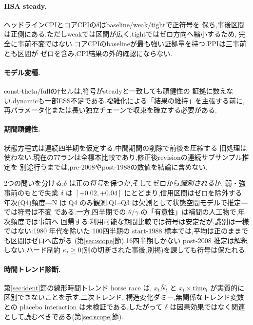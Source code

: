 \documentclass[11pt]{article}
\newcommand{\kt}{\kappa_t}
\begin{document}
\begin{table}[H]
\centering
\caption{失業ギャップ仕様の全モデル・三事前感応度.$\dagger$は収束基準外で解釈しない.}
\label{tab:current-priors}
\tiny
\resizebox{\linewidth}{!}{}
\end{table}

\paragraph{HSA steady.} ヘッドラインCPIとコアCPIの$\delta$はbaseline/weak/tightで正符号を
保ち,事後区間は正側にある.ただしweakでは区間が広く,tightではゼロ方向へ縮小するため,
完全に事前不変ではない.コアCPIのbaselineが最も強い証拠量を持つ.PPIは三事前とも区間が
ゼロを含み,CPI結果の外的確認にならない.

\paragraph{モデル変種.} const-theta/fullの$\dagger$セルは,符号がsteadyと一致しても頑健性の
証拠に数えない.dynamicも一部ESS不足である.複雑化による「結果の維持」を主張する前に,
再パラメータ化または長い独立チェーンで収束を確立する必要がある.

\paragraph{期間頑健性.} 状態方程式は連続四半期を仮定する.中間期間の削除で前後を圧縮する
旧処理は使わない.現在の77ランは全標本比較であり,修正後revisionの連続サブサンプル推定を
別途行うまでは,pre-2008やpost-1988の数値を結論に含めない.

\iffalse
2つの問いを分ける:$\delta$ は正の\emph{符号}を保つか,そしてゼロから\emph{識別される}か.
弱・強事前のもとで失業 $\delta$ は $[+0.02,+0.04]$ にとどまり,信用区間はゼロを除外する.
年次(Q4)頻度---N は Q4 のみ観測,Q1--Q3 は欠測として状態空間モデルで推定---では符号は不変
である.一方,四半期での $\theta/\gamma$ の「有意性」は補間の人工物で,年次頻度では事前へ
回帰する.利用可能な期間比較では符号は安定だが,識別は一様ではない:1980 年代を除いた
100四半期の start-1988 標本では,平均は正のままでも区間はゼロへ広がる
(第\ref{sec:scope}節).16四半期しかない post-2008 推定は解釈しない.ハード制約
$\kt\ge0$(別の切断された事後,別掲)を課しても符号は保たれる.

\paragraph{時間トレンド診断.} 第\ref{sec:ident}節の線形時間トレンド horse race は,
$x_t\bar N_t$ と $x_t\times\mathrm{time}_t$ が実質的に区別できないことを示す.二次トレンド,
構造変化ダミー,無関係なトレンド変数との placebo interaction は未検証である.したがって
$\delta$ は因果効果ではなく関連として読むべきである(第\ref{sec:scope}節).
\end{document}
